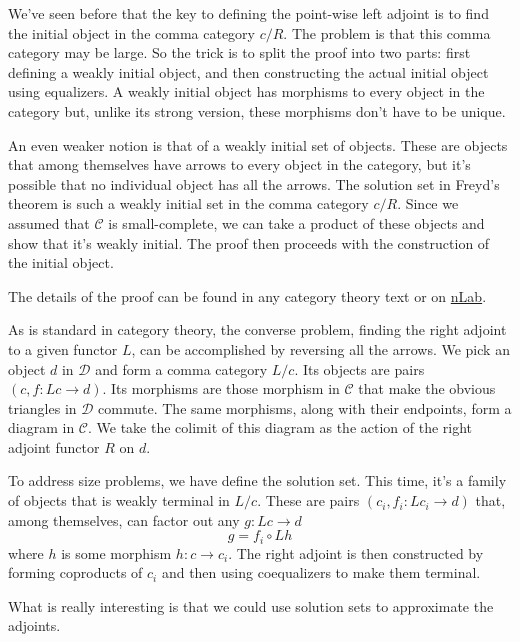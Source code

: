 \documentclass[11pt]{amsart}
\newcommand{\cat}[1]{\mathcal{#1}}
\begin{document}
We've seen before that the key to defining the point-wise left adjoint is to find the initial object in the comma category $c/R$. The problem is that this comma category may be large. So the trick is to split the proof into two parts: first defining a weakly initial object, and then constructing the actual initial object using equalizers. A weakly initial object has morphisms to every object in the category but, unlike its strong version, these morphisms don't have to be unique. 

An even weaker notion is that of a weakly initial set of objects. These are objects that among themselves have arrows to every object in the category, but it's possible that no individual object has all the arrows. The solution set in Freyd's theorem is such a weakly initial set in the comma category $c/R$. Since we assumed that $\cat C$ is small-complete, we can take a product of these objects and show that it's weakly initial. The proof then proceeds with the construction of the initial object. 

The details of the proof can be found in any category theory text or on \href{https://ncatlab.org/nlab/show/adjoint+functor+theorem}{nLab}. 

As is standard in category theory, the converse problem, finding the right adjoint to a given functor $L$, can be accomplished by reversing all the arrows. We pick an object $d$ in $\cat D$ and form a comma category $L/c$. Its objects are pairs $(c, f \colon L c \to d)$. Its morphisms are those morphism in $\cat C$ that make the obvious triangles in $\cat D$ commute. The same morphisms, along with their endpoints, form a diagram in $\cat C$. We take the colimit of this diagram as the action of the right adjoint functor $R$ on $d$. 

To address size problems, we have define the solution set. This time, it's a family of objects that is weakly terminal in $L/c$. These are pairs $(c_i, f_i \colon L c_i \to d)$ that, among themselves, can factor out any $g \colon L c \to d$
\[ g = f_i \circ L h \]
where $h$ is some morphism $h \colon c \to c_i$. The right adjoint is then constructed by forming coproducts of $c_i$ and then using coequalizers to make them terminal. 

What is really interesting is that we could use solution sets to approximate the adjoints.  
\end{document}
